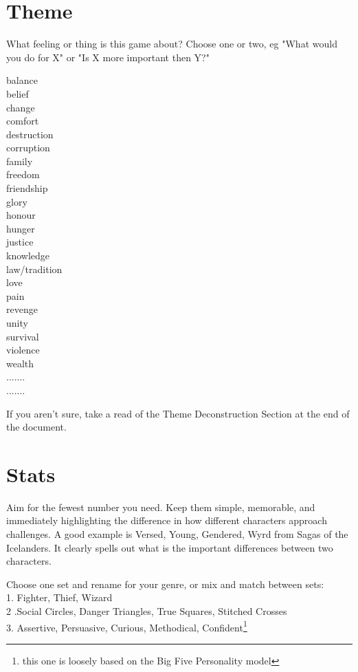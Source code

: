 \documentclass{tufte-handout}
\begin{document}
\section{Theme}
What feeling or thing is this game about?
Choose one or two, eg
"What would you do for X"
or
"Is X more important then Y?"

\begin{multicols}{3}
balance\\
belief\\
change\\
comfort\\
destruction \\
corruption\\
family \\
freedom\\
friendship\\
glory\\
honour\\
hunger\\
justice\\
knowledge \\
law/tradition\\
love\\
pain\\
revenge\\
unity\\
survival\\
violence\\
wealth\\
.......\\
.......\\
\end{multicols}


If you aren't sure, take a read of the Theme Deconstruction Section at the end of the document.

\section{Stats}
Aim for the fewest number you need. Keep them simple, memorable, and immediately highlighting the difference in how different characters approach challenges. A good example is Versed, Young, Gendered, Wyrd from Sagas of the Icelanders. It clearly spells out what is the important differences between two characters.

Choose one set and rename for your genre, or mix and match between sets:\\
1. Fighter, Thief, Wizard\\
2 .Social Circles, Danger Triangles, True Squares, Stitched Crosses \\
3. Assertive, Persuasive, Curious, Methodical, Confident\footnote{this one is loosely based on the Big Five Personality model}\\
\end{document}
